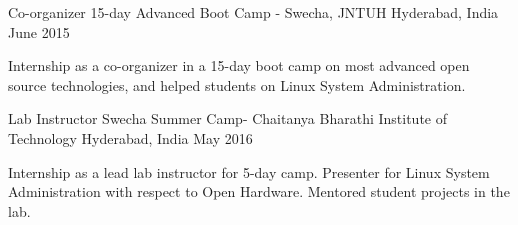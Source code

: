 \begin{cventries}
    \cventry
    {Co-organizer}
    {15-day Advanced Boot Camp - Swecha, JNTUH}
    {Hyderabad, India}
    {June 2015}
    {
    \begin{cvitems}
        \item {Internship as a co-organizer in a 15-day boot camp on most advanced open source technologies, and helped students on Linux System Administration.}
    \end{cvitems}
    }
    \cventry
    {Lab Instructor}
    {Swecha Summer Camp- Chaitanya Bharathi Institute of Technology}
    {Hyderabad, India}
    {May 2016}
    {
      \begin{cvitems}
        \item {Internship as a lead lab instructor for 5-day camp. Presenter for Linux System Administration with respect to Open Hardware. Mentored student projects in the lab.}
      \end{cvitems}
    }
\end{cventries}
